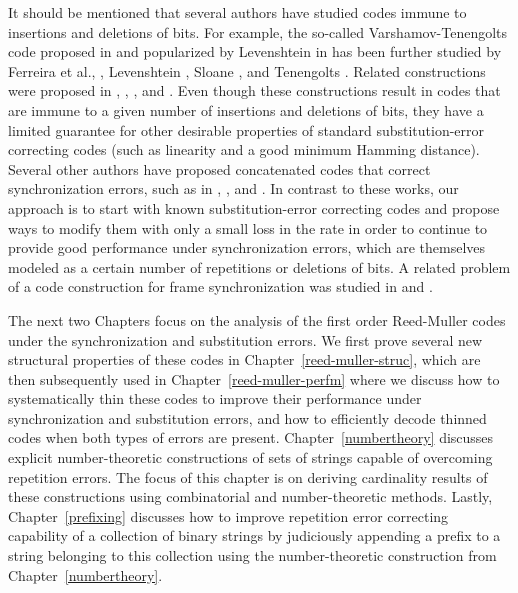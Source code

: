 It should be mentioned that several authors have studied codes
immune to insertions and deletions of bits. For example, the
so-called Varshamov-Tenengolts code proposed in \cite{vt:65} and
popularized by Levenshtein in \cite {lev:66} has been further
studied by Ferreira et al., \cite {ferr:97}, Levenshtein
\cite{lev:92}, Sloane \cite{sloane:00}, and Tenengolts
\cite{ten:84}. Related constructions were proposed in
\cite{bours:94}, \cite{calabi:69}, \cite{clarke:93}, \cite{klove:95}
and \cite{ullman:66}. Even though these constructions result in
codes that are immune to a given number of insertions and deletions
of bits, they have a limited guarantee for other desirable
properties of standard substitution-error correcting codes (such as
linearity and a good minimum Hamming distance). Several other
authors have proposed concatenated codes that correct
synchronization errors, such as in \cite{cmnv:03}, \cite{cf:03}, and
\cite{dmackay:01}. In contrast to these works, our approach is to
start with known substitution-error correcting codes and propose
ways to modify them with only a small loss in the rate in order to
continue to provide good performance under synchronization errors,
which are themselves modeled as a certain number of repetitions or
deletions of bits. A related problem of a code construction for
frame synchronization was studied in \cite{stiffler:65} and
\cite{bose:67}.


The next two Chapters focus on the analysis of the first order
Reed-Muller codes under the synchronization and substitution errors.
We first prove several new structural properties of these codes in
Chapter~\ref{reed-muller-struc}, which are then subsequently used in
Chapter~\ref{reed-muller-perfm} where we discuss how to
systematically thin these codes to improve their performance under
synchronization and substitution errors, and how to efficiently
decode thinned codes when both types of errors are present.
Chapter~\ref{numbertheory} discusses explicit number-theoretic
constructions of sets of strings capable of overcoming repetition
errors. The focus of this chapter is on deriving cardinality results
of these constructions using combinatorial and number-theoretic
methods. Lastly, Chapter~\ref{prefixing} discusses how to improve
repetition error correcting capability of a collection of binary
strings  by judiciously appending a prefix to a string belonging to
this collection  using the number-theoretic construction from
Chapter~\ref{numbertheory}.
